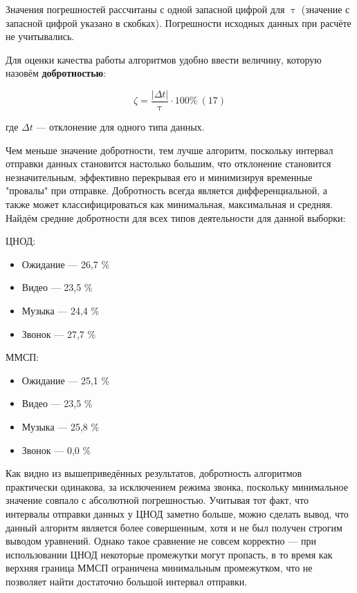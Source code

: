 \documentclass[12pt]{report}
\let\tau\uptau
\begin{document}
Значения погрешностей рассчитаны с одной запасной цифрой для $\tau$ (значение с запасной цифрой указано в скобках). Погрешности исходных данных при расчёте не учитывались.

Для оценки качества работы алгоритмов удобно ввести величину, которую назовём \textbf{добротностью}:

$$\zeta = \frac{|\Delta t|}{\tau} \cdot 100\% \ (17)$$

где $\Delta t$ — отклонение для одного типа данных.

Чем меньше значение добротности, тем лучше алгоритм, поскольку интервал отправки данных становится настолько большим, что отклонение становится незначительным, эффективно перекрывая его и минимизируя временные "провалы" 
 при отправке. Добротность всегда является дифференциальной, а также может классифицироваться как минимальная, максимальная и средняя. Найдём средние добротности для всех типов деятельности для данной выборки:
\vspace{0.5cm}

\begin{minipage}[b]{0.45\textwidth}
    \centering ЦНОД:
    \begin{itemize}
        \item Ожидание — 26,7 \%
        \item Видео — 23,5 \%
        \item Музыка — 24,4 \%
        \item Звонок — 27,7 \%
    \end{itemize}\end{minipage}
\hfill
\begin{minipage}[b]{0.45\textwidth}
    \centering ММСП:
    \begin{itemize}
        \item Ожидание — 25,1 \%
        \item Видео — 23,5 \%
        \item Музыка — 25,8 \%
        \item Звонок — 0,0 \%
    \end{itemize}
\end{minipage}

Как видно из вышеприведённых результатов, добротность алгоритмов практически одинакова, за исключением режима звонка, поскольку минимальное значение совпало с абсолютной погрешностью. Учитывая тот факт, что интервалы отправки данных у ЦНОД заметно больше, можно сделать вывод, что данный алгоритм является более совершенным, хотя и не был получен строгим выводом уравнений. Однако такое сравнение не совсем корректно — при использовании ЦНОД некоторые промежутки могут пропасть, в то время как верхняя граница ММСП ограничена минимальным промежутком, что не позволяет найти достаточно большой интервал отправки.
\end{document}
